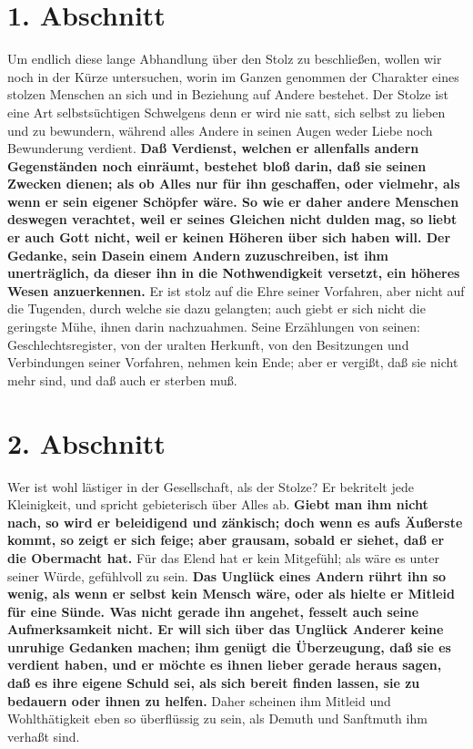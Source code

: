 \section{1. Abschnitt} \label{kap12_ab1}

 Um endlich diese lange Abhandlung über den Stolz
zu beschließen, wollen wir noch
in der Kürze untersuchen, worin im Ganzen genommen der Charakter eines stolzen
Menschen an sich und in Beziehung auf Andere bestehet. Der Stolze ist eine Art
selbstsüchtigen Schwelgens denn er wird nie satt, sich selbst zu lieben und zu
bewundern, während alles Andere in seinen Augen weder Liebe noch Bewunderung
verdient.   \textbf{Daß Verdienst, welchen er allenfalls andern
Gegenständen noch
einräumt, bestehet bloß darin, daß sie seinen Zwecken dienen; als ob Alles nur
für ihn geschaffen, oder vielmehr, als wenn er sein eigener Schöpfer wäre. So
wie er daher andere Menschen deswegen verachtet, weil er seines Gleichen nicht
dulden mag, so liebt er auch Gott nicht, weil er keinen Höheren über sich haben
will. Der Gedanke, sein Dasein einem Andern zuzuschreiben, ist ihm unerträglich,
da dieser ihn in die Nothwendigkeit versetzt, ein höheres Wesen anzuerkennen.}
Er
ist stolz auf die Ehre seiner Vorfahren, aber nicht auf die Tugenden, durch
welche sie dazu gelangten; auch giebt er sich nicht die geringste Mühe, ihnen
darin nachzuahmen. Seine Erzählungen von seinen: Geschlechtsregister, von der
uralten Herkunft, von den Besitzungen und Verbindungen seiner Vorfahren, nehmen
kein Ende; aber er vergißt, daß sie nicht mehr sind, und daß auch er sterben
muß.

\section{2. Abschnitt} \label{kap12_ab2}

Wer ist wohl lästiger in der Gesellschaft, als der Stolze? Er bekritelt jede
Kleinigkeit, und spricht gebieterisch über Alles ab. \textbf{Giebt man ihm nicht
nach,
so wird er beleidigend und zänkisch; doch wenn es aufs Äußerste kommt, so zeigt
er sich feige; aber grausam, sobald er siehet, daß er die
Obermacht hat.} Für das
Elend hat er kein Mitgefühl; als wäre es unter seiner
Würde, gefühlvoll zu sein.
\textbf{Das Unglück eines Andern rührt ihn so wenig, als wenn er selbst kein
Mensch
wäre, oder als hielte er Mitleid für eine Sünde. Was nicht gerade
ihn angehet,
fesselt auch seine Aufmerksamkeit nicht. Er will sich über das Unglück Anderer
keine unruhige Gedanken machen; ihm genügt die  Überzeugung, daß sie es
verdient haben, und er möchte es ihnen lieber gerade heraus sagen, daß es ihre
eigene Schuld sei, als sich bereit finden lassen, sie zu bedauern
oder ihnen zu
helfen.} Daher scheinen ihm Mitleid und Wohlthätigkeit eben so
überflüssig zu
sein, als Demuth und Sanftmuth ihm verhaßt sind.

